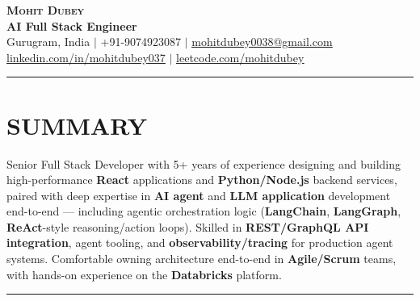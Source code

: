 \documentclass[100pt,a4paper]{article}
\newcommand{\sectionline}{
\begin{center}
\vspace{-10pt}
\rule{1\textwidth}{0.5pt}
\end{center}
\vspace{1pt}
}
\begin{document}
\begin{center}
    \textbf{\Huge \scshape Mohit Dubey} \\ \vspace{4pt}
    \textbf{AI Full Stack Engineer } \\ \vspace{6pt}
    \small Gurugram, India $|$ +91-9074923087 $|$ \href{mailto:mohitdubey0038@gmail.com}{\underline{mohitdubey0038@gmail.com}} \\
    \href{https://www.linkedin.com/in/mohit-dubey-037/}{\underline{linkedin.com/in/mohitdubey037}} $|$ \href{https://leetcode.com/u/mohitdubey037/}
    {\underline{leetcode.com/mohitdubey}}
\end{center}


\sectionline
\section*{SUMMARY}
Senior Full Stack Developer with 5+ years of experience designing and building high-performance \textbf{React} applications and \textbf{Python/Node.js} backend services, paired with deep expertise in \textbf{AI agent} and \textbf{LLM application} development end-to-end — including agentic orchestration logic (\textbf{LangChain}, \textbf{LangGraph}, \textbf{ReAct}-style reasoning/action loops). Skilled in \textbf{REST/GraphQL API integration}, agent tooling, and \textbf{observability/tracing} for production agent systems. Comfortable owning architecture end-to-end in \textbf{Agile/Scrum} teams, with hands-on experience on the \textbf{Databricks} platform.

\sectionline
\end{document}
